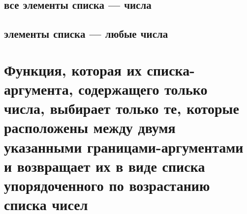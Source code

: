 \subsection{все элементы списка --- числа}


\subsection{элементы списка --- любые числа}



\section{Функция, которая их списка-аргумента, содержащего только числа, выбирает только те, которые расположены между двумя указанными гра\-ни\-ца\-ми-аргументами и возвращает их в виде списка упорядоченного по возрастанию списка чисел}